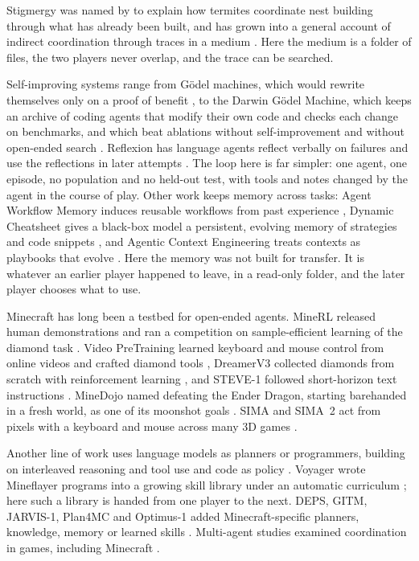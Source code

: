 \documentclass[11pt,a4paper]{article}
\begin{document}
Stigmergy was named by \citet{grasse1959} to explain how termites coordinate nest building through what has already been built, and has grown into a general account of indirect coordination through traces in a medium \citep{theraulaz1999,heylighen2016}. Here the medium is a folder of files, the two players never overlap, and the trace can be searched.

Self-improving systems range from G\"odel machines, which would rewrite themselves only on a proof of benefit \citep{schmidhuber2003}, to the Darwin G\"odel Machine, which keeps an archive of coding agents that modify their own code and checks each change on benchmarks, and which beat ablations without self-improvement and without open-ended search \citep{zhang2025dgm}. Reflexion has language agents reflect verbally on failures and use the reflections in later attempts \citep{shinn2023reflexion}. The loop here is far simpler: one agent, one episode, no population and no held-out test, with tools and notes changed by the agent in the course of play. Other work keeps memory across tasks: Agent Workflow Memory induces reusable workflows from past experience \citep{wang2024awm}, Dynamic Cheatsheet gives a black-box model a persistent, evolving memory of strategies and code snippets \citep{suzgun2025cheatsheet}, and Agentic Context Engineering treats contexts as playbooks that evolve \citep{zhang2025ace}. Here the memory was not built for transfer. It is whatever an earlier player happened to leave, in a read-only folder, and the later player chooses what to use.

Minecraft has long been a testbed for open-ended agents. MineRL released human demonstrations and ran a competition on sample-efficient learning of the diamond task \citep{guss2019minerl,guss2019competition}. Video PreTraining learned keyboard and mouse control from online videos and crafted diamond tools \citep{baker2022vpt}, DreamerV3 collected diamonds from scratch with reinforcement learning \citep{hafner2025dreamer}, and STEVE-1 followed short-horizon text instructions \citep{lifshitz2023steve}. MineDojo named defeating the Ender Dragon, starting barehanded in a fresh world, as one of its moonshot goals \citep{fan2022minedojo}. SIMA and SIMA~2 act from pixels with a keyboard and mouse across many 3D games \citep{sima2024,sima2025}.

Another line of work uses language models as planners or programmers, building on interleaved reasoning and tool use \citep{yao2023react} and code as policy \citep{liang2023code}. Voyager wrote Mineflayer programs into a growing skill library under an automatic curriculum \citep{wang2024voyager}; here such a library is handed from one player to the next. DEPS, GITM, JARVIS-1, Plan4MC and Optimus-1 added Minecraft-specific planners, knowledge, memory or learned skills \citep{wang2023deps,zhu2023gitm,wang2025jarvis,yuan2023plan4mc,li2024optimus}. Multi-agent studies examined coordination in games, including Minecraft \citep{gong2024mindagent,altera2024sid,white2025collaborating}.
\end{document}
